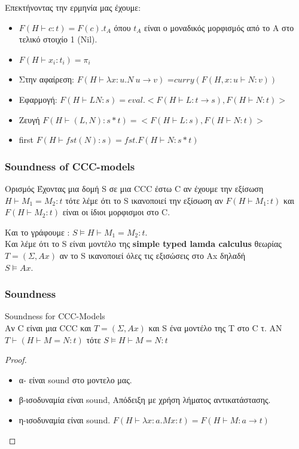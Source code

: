 \documentclass[hyperref={pdfpagelabels=false}]{beamer}
\begin{document}
\begin{frame}
Επεκτήνοντας την ερμηνία μας έχουμε:
\begin{itemize}
        \item $F(H \vdash c:t) =F(c).t_A$ όπου $t_A$ είναι ο μοναδικός μορφισμός από το Α στο τελικό στοιχίο 1 (Nil). 
        \item $F(H \vdash x_i : t_i)=\pi_i$
        \item<2-> Στην αφαίρεση: $F(H \vdash  	\lambda x : u . N \: u \rightarrow v)$ =$ curry(F(H , x : u \vdash N : v))$
        \item<3-> Εφαρμογή: $F(H \vdash LN:s) = eval . <F(H\vdash L: t\rightarrow s),F(H \vdash N:t)>$
        \item<4-> Ζευγή $F(H \vdash (L,N): s*t)=<F(H\vdash L:s),F(H \vdash N:t)>$
        \item<5->{ first $F(H \vdash fst(N):s)=fst . F(H \vdash N : s*t)$
		\uncover<6->{\\ second $F(H \vdash snd(N):s)=snd . F(H \vdash N : s*t)$}}
\end{itemize}

\end{frame}
\begin{frame}
	\frametitle{Soundness of CCC-models}
	\begin{block}{Ορισμός} Έχοντας μια δομή S σε μια CCC έστω C αν έχουμε την εξίσωση $H \vdash M_1=M_2 :t$ τότε λέμε ότι το S ικανοποιεί την εξίσωση αν $F(H \vdash M_1:t)$ και $F(H \vdash M_2 :t)$ είναι οι ίδιοι μορφισμοι στο C.\end{block}
Και το γράφουμε : 
$S \models H \vdash M_1 = M_2 :t$.\\ 
Και λέμε ότι το  S είναι μοντέλο της \textbf{ simple typed lamda calculus} θεωρίας $T = (\Sigma,Ax)$ αν το S ικανοποιεί όλες τις εξισώσεις στο Ax δηλαδή \\ $S \models Ax$.\\
\end{frame}
\begin{frame}
	\frametitle{Soundness}
\begin{block}{Soundness for CCC-Models} \\
	Αν C είναι μια CCC και $T=(\Sigma,Ax)$ και S ένα μοντέλο της Τ στο C τ. ΑΝ $T \vdash (H \vdash M=N:t)$ τότε $S \models H \vdash M=N:t$\end{block}
\begin{proof} \begin{itemize}
			\item α- είναι sound στο μοντελο μας.
			\item β-ισοδυναμία είναι sound, Απόδειξη με χρήση λήματος αντικατάστασης.
			\item η-ισοδυναμία είναι sound. $F(H \vdash \lambda x: a.Mx :t)=F(H \vdash M:a \rightarrow t)$
		\end{itemize}\end{proof}

\end{frame}
\end{document}
